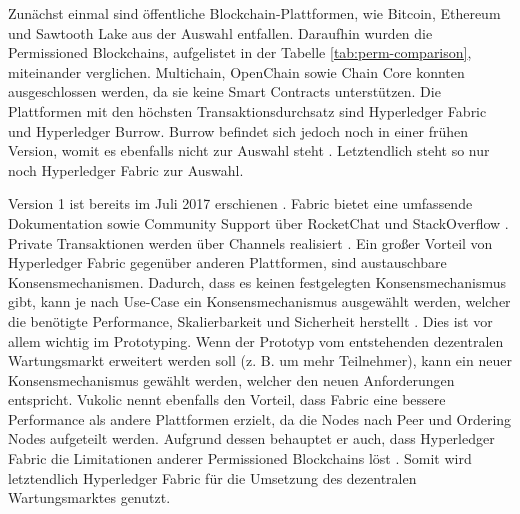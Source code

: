 Zunächst einmal sind öffentliche Blockchain-Plattformen, wie Bitcoin, Ethereum und Sawtooth Lake aus der Auswahl entfallen. Daraufhin wurden die Permissioned Blockchains, aufgelistet in der Tabelle \ref{tab:perm-comparison}, miteinander verglichen. Multichain, OpenChain sowie Chain Core konnten ausgeschlossen werden, da sie keine Smart Contracts unterstützen. Die Plattformen mit den höchsten Transaktionsdurchsatz sind Hyperledger Fabric und Hyperledger Burrow. Burrow befindet sich jedoch noch in einer frühen Version, womit es ebenfalls nicht zur Auswahl steht \cite{HyperledgerFabricTeamHyperledgerFabricReleases2018}. Letztendlich steht so nur noch Hyperledger Fabric zur Auswahl. 

Version 1 ist bereits im Juli 2017 erschienen \cite{HyperledgerFabricTeamHyperledgerFabricReleases2018}. Fabric bietet eine umfassende Dokumentation sowie Community Support über RocketChat und StackOverflow \cite{HyperledgerFabricTeamSupportHyperledgerFabric}. Private Transaktionen werden über Channels realisiert \cite{SchererPerformanceScalabilityBlockchain2017}. Ein großer Vorteil von Hyperledger Fabric gegenüber anderen Plattformen, sind austauschbare Konsensmechanismen. Dadurch, dass es keinen festgelegten Konsensmechanismus gibt, kann je nach Use-Case ein Konsensmechanismus ausgewählt werden, welcher die benötigte Performance, Skalierbarkeit und Sicherheit herstellt \cite{VukolicRethinkingPermissionedBlockchains2017}. Dies ist vor allem wichtig im Prototyping. Wenn der Prototyp vom entstehenden dezentralen Wartungsmarkt erweitert werden soll (z. B. um mehr Teilnehmer), kann ein neuer Konsensmechanismus gewählt werden, welcher den neuen Anforderungen entspricht. Vukolic nennt ebenfalls den Vorteil, dass Fabric eine bessere Performance als andere Plattformen erzielt, da die Nodes nach Peer und Ordering Nodes aufgeteilt werden. Aufgrund dessen behauptet er auch, dass Hyperledger Fabric die Limitationen anderer Permissioned Blockchains löst \cite{VukolicRethinkingPermissionedBlockchains2017}. Somit wird letztendlich Hyperledger Fabric für die Umsetzung des dezentralen Wartungsmarktes genutzt.

